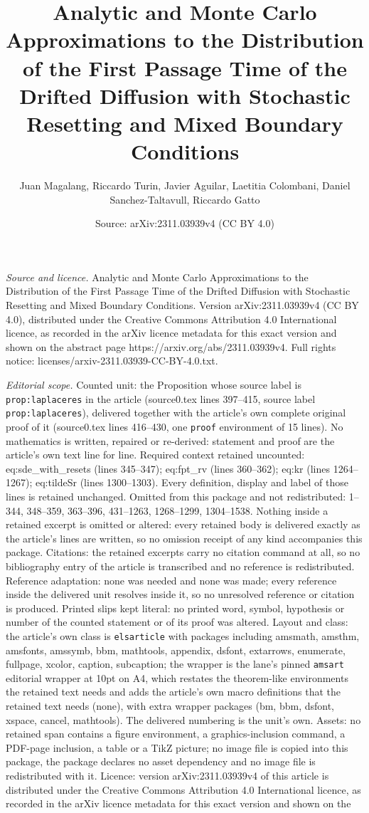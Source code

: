 \documentclass[10pt,a4paper]{amsart}
\title[Analytic and Monte Carlo Approximations to the Distribution ]{Analytic and Monte Carlo Approximations to the Distribution of the First Passage Time of the Drifted Diffusion with Stochastic Resetting and Mixed Boundary Conditions}
\author{Juan Magalang, Riccardo Turin, Javier Aguilar, Laetitia Colombani, Daniel Sanchez-Taltavull, Riccardo Gatto}
\date{Source: arXiv:2311.03939v4 (CC BY 4.0)}
\begin{document}
\maketitle

\noindent\emph{Source and licence.} Analytic and Monte Carlo Approximations to the Distribution of the First Passage Time of the Drifted Diffusion with Stochastic Resetting and Mixed Boundary Conditions. Version arXiv:2311.03939v4 (CC BY 4.0), distributed under the Creative Commons Attribution 4.0 International licence, as recorded in the arXiv licence metadata for this exact version and shown on the abstract page https://arxiv.org/abs/2311.03939v4. Full rights notice: licenses/arxiv-2311.03939-CC-BY-4.0.txt.\par\smallskip

\noindent\textit{Editorial scope.} Counted unit: the Proposition whose source label is \texttt{prop:laplaceres} in the article (source0.tex lines 397--415, source label \texttt{prop:laplaceres}), delivered together with the article's own complete original proof of it (source0.tex lines 416--430, one \texttt{proof} environment of 15 lines). No mathematics is written, repaired or re-derived: statement and proof are the article's own text line for line. Required context retained uncounted: eq:sde\_with\_resets (lines 345--347); eq:fpt\_rv (lines 360--362); eq:kr (lines 1264--1267); eq:tildeSr (lines 1300--1303). Every definition, display and label of those lines is retained unchanged. Omitted from this package and not redistributed: 1--344, 348--359, 363--396, 431--1263, 1268--1299, 1304--1538. Nothing inside a retained excerpt is omitted or altered: every retained body is delivered exactly as the article's lines are written, so no omission receipt of any kind accompanies this package. Citations: the retained excerpts carry no citation command at all, so no bibliography entry of the article is transcribed and no reference is redistributed. Reference adaptation: none was needed and none was made; every reference inside the delivered unit resolves inside it, so no unresolved reference or citation is produced. Printed slips kept literal: no printed word, symbol, hypothesis or number of the counted statement or of its proof was altered. Layout and class: the article's own class is \texttt{elsarticle} with packages including amsmath, amsthm, amsfonts, amssymb, bbm, mathtools, appendix, dsfont, extarrows, enumerate, fullpage, xcolor, caption, subcaption; the wrapper is the lane's pinned \texttt{amsart} editorial wrapper at 10pt on A4, which restates the theorem-like environments the retained text needs and adds the article's own macro definitions that the retained text needs (none), with extra wrapper packages (bm, bbm, dsfont, xspace, cancel, mathtools). The delivered numbering is the unit's own. Assets: no retained span contains a figure environment, a graphics-inclusion command, a PDF-page inclusion, a table or a TikZ picture; no image file is copied into this package, the package declares no asset dependency and no image file is redistributed with it. Licence: version arXiv:2311.03939v4 of this article is distributed under the Creative Commons Attribution 4.0 International licence, as recorded in the arXiv licence metadata for this exact version and shown on the 
\end{document}

